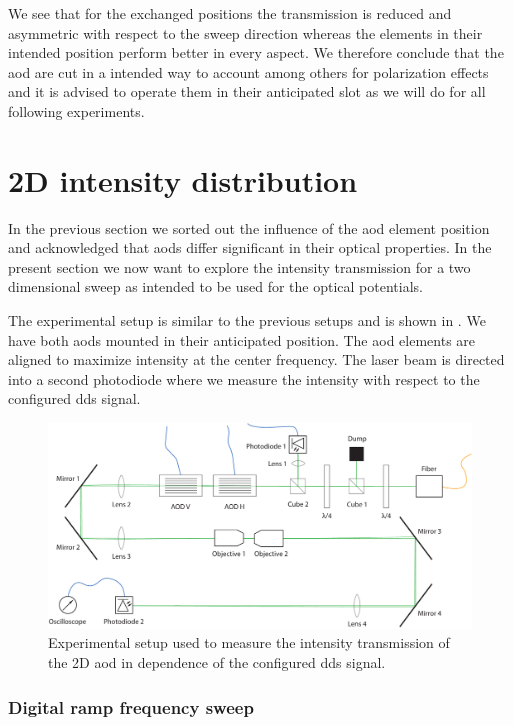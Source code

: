 We see that for the exchanged positions the transmission is reduced and
asymmetric with respect to the sweep direction whereas the elements in their
intended position perform better in every aspect. We therefore conclude that
the \gls{aod} are cut in a intended way to account among others for
polarization effects and it is advised to operate them in their anticipated
slot as we will do for all following experiments.

\section{2D intensity distribution}

In the previous section we sorted out the influence of the \gls{aod} element
position and acknowledged that \gls{aod}s differ significant in their
optical properties. In the present section we now want to explore the
intensity transmission for a two dimensional sweep as intended to be used
for the optical potentials.

The experimental setup is similar to the previous setups and is shown in
. We have both \gls{aod}s mounted in
their anticipated position. The \gls{aod} elements are aligned to maximize
intensity at the center frequency. The laser beam is directed into a second
photodiode where we measure the intensity with respect to the configured
\gls{dds} signal.
\begin{figure}[htb]
  \centering
  \includegraphics[width=\textwidth]{../media/setup/intensity-distribution.pdf}
  \caption{Experimental setup used to measure the intensity transmission of
    the 2D \gls{aod} in dependence of the configured \gls{dds} signal.
  }\label{fig:intensity_distribution_setup}
\end{figure}

\subsubsection{Digital ramp frequency sweep}

